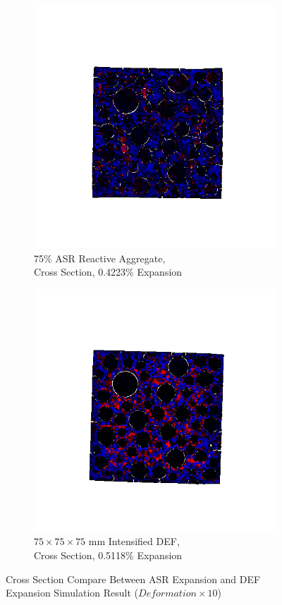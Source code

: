 \begin{figure}[ht]
\centering

    \begin{subfigure}{.5\textwidth}
      \centering
      \includegraphics[width=.5\linewidth]{Files/exp_3D/ASR/A30P75_3_stress.png}
      \caption{75\% ASR Reactive Aggregate, \\ Cross Section, 0.4223\% Expansion}
    \end{subfigure}%
    \begin{subfigure}{.5\textwidth}
      \centering
      \includegraphics[width=.5\linewidth]{Files/exp_3D/DEF/A30X-5C_3_stress.png}
      \caption{$75 \times 75 \times 75$ mm Intensified DEF, \\ Cross Section, 0.5118\% Expansion}
    \end{subfigure}

    

  \caption{Cross Section Compare Between ASR Expansion and DEF Expansion Simulation Result ($Deformation \times 10$)}
  \label{fig:ASRvsDEF_IS}
\end{figure}


